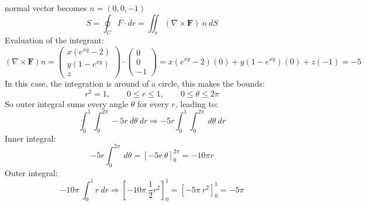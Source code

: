 normal vector becomes $n=(0,0,-1)$
\[S=\oint_C F \cdot dr = \iint_s (\nabla \times \mathbf{F}) \  n \ dS\]
Evaluation of the integrant:
\[(\nabla \times \mathbf{F}) n = 
\begin{pmatrix}
x(e^{xy}-2)\\
y(1-e^{xy})\\
z
\end{pmatrix}
\cdot 
\begin{pmatrix}
    0\\
    0\\
    -1
\end{pmatrix}
= x(e^{xy}-2)(0) + y(1-e^{xy})(0) + z(-1) 
=-5 \]
In this case, the integration is around of a circle, this makes the bounds: 
\[r^2 = 1,\qquad 0\le r \le1, \qquad 0\le \theta \le 2\pi\]
So outer integral sums every angle $\theta$ for every $r$, leading to:
\[\int_{0}^{1}\int_{0}^{2\pi}-5r \ d\theta \ dr \Rightarrow -5r \int_{0}^{1}\int_{0}^{2\pi} \ d\theta \ dr\] 
Inner integral:
\[-5r\int_{0}^{2\pi} \ d\theta = \left[-5r \ \theta\right]_0^{2\pi} = -10\pi r\]
Outer integral:
\[-10\pi \ \int_{0}^{1} r \ dr \Rightarrow \left[-10\pi \ \frac{1}{2}r^2\right]_0^1 = \left[-5\pi \ r^2 \right]_0^1 = -5\pi \]
\[\]
